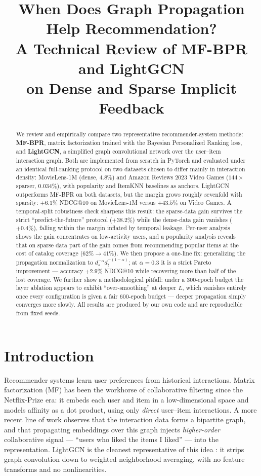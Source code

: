 \documentclass[11pt]{article}
\title{When Does Graph Propagation Help Recommendation?\\
A Technical Review of MF-BPR and LightGCN\\
on Dense and Sparse Implicit Feedback}
\date{}
\begin{document}
\maketitle

\begin{abstract}
We review and empirically compare two representative recommender-system
methods: \textbf{MF-BPR}, matrix factorization trained with the Bayesian
Personalized Ranking loss, and \textbf{LightGCN}, a simplified graph
convolutional network over the user--item interaction graph. Both are
implemented from scratch in PyTorch and evaluated under an identical
full-ranking protocol on two datasets chosen to differ mainly in interaction
density: MovieLens-1M (dense, 4.8\%) and Amazon Reviews 2023 Video Games
($144\times$ sparser, 0.034\%), with popularity and ItemKNN baselines as
anchors. LightGCN outperforms MF-BPR on both datasets,
but the margin grows roughly sevenfold with sparsity: $+6.1\%$ NDCG@10
on MovieLens-1M versus $+43.5\%$ on Video Games. A temporal-split robustness
check sharpens this result: the sparse-data gain survives the strict
``predict-the-future'' protocol ($+38.2\%$) while the dense-data gain vanishes
($+0.4\%$), falling within the margin inflated by temporal leakage. Per-user
analysis shows the gain concentrates on low-activity users, and a popularity
analysis reveals that on sparse data part of the gain comes from recommending
popular items at the cost of catalog coverage
($62\%\!\rightarrow\!41\%$). We then propose a one-line fix: generalizing the
propagation normalization to $d_s^{-\alpha} d_t^{-(1-\alpha)}$; at
$\alpha{=}0.3$ it is a strict Pareto improvement --- accuracy $+2.9\%$
NDCG@10 while recovering more than half of the lost coverage. We further show a
methodological pitfall: under a 300-epoch budget the layer ablation appears to
exhibit ``over-smoothing'' at deeper $L$, which vanishes entirely once every
configuration is given a fair 600-epoch budget --- deeper propagation simply
converges more slowly. All results are produced by our own code and are
reproducible from fixed seeds.
\end{abstract}

\section{Introduction}

Recommender systems learn user preferences from historical interactions.
Matrix factorization (MF) has been the workhorse of collaborative filtering
since the Netflix-Prize era: it embeds each user and item in a low-dimensional
space and models affinity as a dot product, using only \emph{direct}
user--item interactions. A more recent line of work observes that the
interaction data forms a bipartite graph, and that propagating embeddings over
this graph injects \emph{higher-order} collaborative signal --- ``users who
liked the items I liked'' --- into the representation. LightGCN is the
cleanest representative of this idea \cite{lightgcn}: it strips graph convolution down to
weighted neighborhood averaging, with no feature transforms and no
nonlinearities.
\end{document}
